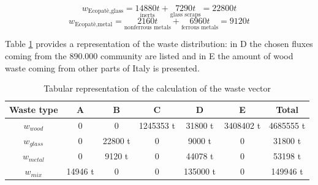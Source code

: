 \begin{equation*}
    w_{\text{Ecopatè,glass}}=\underset{\text{inerts}}{14880 t} + \underset{\text{glass scraps}}{7290t}= 22800t 
\end{equation*}
\begin{equation*}
    w_{\text{Ecopatè,metal}}=\underset{\text{nonferrous metals}}{2160t}+\underset{\text{ferrous metals}}{6960t}=9120t
\end{equation*}
\vspace{3mm}

\noindent Table \ref{tab:wastetable} provides a representation of the waste distribution: in D the chosen fluxes coming from the 890.000 community are listed and in E the amount of wood waste coming from other parts of Italy is presented.
\begin{table}[t]
\centering
\begin{tcolorbox}[
    colback=sapienza!5,     %
    colframe=sapienza!20,   %
    arc=3pt,                 %
    boxrule=1pt,             %
    width=\textwidth,        %
    halign=center            %
]
    \begin{tabular}{c | c c c c c | c}
    \toprule
    \textbf{Waste type} & \textbf{A} & \textbf{B} & \textbf{C} & \textbf{D} & \textbf{E} & \textbf{Total} \\
    \midrule \midrule 
    $w_{wood}$ & 0 & 0 & 1245353 t & 31800 t & 3408402 t  & 4685555 t \\
    \midrule
    $w_{glass}$ & 0 & 22800 t & 0 & 9000 t & 0 & 31800 t \\
    \midrule
    $w_{metal}$ & 0 & 9120 t & 0 & 44078 t  & 0 & 53198 t \\
    \midrule
    $w_{mix}$ & 14946 t & 0 & 0 & 135000 t & 0 & 149946 t \\
    \bottomrule
    \end{tabular}
\end{tcolorbox}

\vspace{5pt}
\caption{Tabular representation of the calculation of the waste vector}
\label{tab:wastetable}
\end{table}
\newpage
